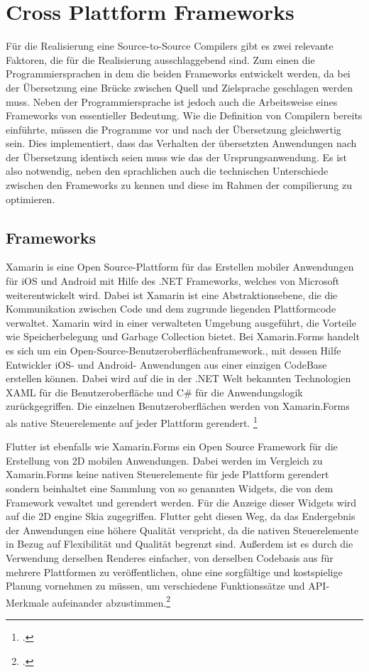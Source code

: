 \chapter{Cross Plattform Frameworks}
Für die Realisierung eine Source-to-Source Compilers gibt es zwei relevante Faktoren,  die für die Realisierung ausschlaggebend sind.  Zum einen die Programmiersprachen in dem die beiden Frameworks entwickelt werden,  da bei der Übersetzung eine Brücke zwischen Quell und Zielsprache geschlagen werden muss.  Neben der Programmiersprache ist jedoch auch die Arbeitsweise eines Frameworks von essentieller Bedeutung.  Wie die Definition von Compilern bereits einführte,  müssen die Programme vor und nach der Übersetzung gleichwertig sein.  Dies implementiert,  dass das Verhalten der übersetzten Anwendungen nach der Übersetzung identisch seien muss wie das der Ursprungsanwendung.  Es ist also notwendig,  neben den sprachlichen auch die technischen Unterschiede zwischen den Frameworks zu kennen und diese im Rahmen der compilierung zu optimieren. 

\section{Frameworks}
Xamarin is eine Open Source-Plattform für das Erstellen mobiler Anwendungen für iOS und Android mit Hilfe des .NET Frameworks, welches von Microsoft weiterentwickelt wird.  Dabei ist Xamarin ist eine Abstraktionsebene, die die Kommunikation zwischen Code und dem zugrunde liegenden Plattformcode verwaltet.  Xamarin wird in einer verwalteten Umgebung ausgeführt, die Vorteile wie Speicherbelegung und Garbage Collection bietet.  Bei Xamarin.Forms handelt es sich um ein Open-Source-Benutzeroberflächenframework., mit dessen Hilfe Entwickler iOS- und Android- Anwendungen aus einer einzigen CodeBase erstellen können.  Dabei wird auf die in der .NET Welt bekannten Technologien XAML  für die Benutzeroberfläche und C\# für die Anwendungslogik zurückgegriffen.  Die einzelnen Benutzeroberflächen werden von Xamarin.Forms als native Steuerelemente auf jeder Plattform gerendert.  \footcite[Vgl.][Abgerufen am \today]{MicrosoftWhatIsXam2020}

Flutter ist ebenfalls wie Xamarin.Forms ein Open Source Framework für die Erstellung von 2D mobilen Anwendungen.  Dabei werden im Vergleich zu Xamarin.Forms keine nativen Steuerelemente für jede Plattform gerendert sondern beinhaltet eine Sammlung von so genannten Widgets, die von dem Framework vewaltet und gerendert werden.  Für die Anzeige dieser Widgets wird auf die 2D engine Skia zugegriffen.  Flutter geht diesen Weg,  da das Endergebnis der Anwendungen eine höhere Qualität verspricht, da die nativen Steuerelemente in Bezug auf Flexibilität und Qualität begrenzt sind.  Außerdem ist es durch die Verwendung derselben Renderes einfacher, von derselben Codebasis aus für mehrere Plattformen zu veröffentlichen,  ohne eine sorgfältige und kostspielige Planung vornehmen zu müssen,  um verschiedene Funktionssätze und API-Merkmale aufeinander abzustimmen.\footcite[Vgl.][Abgerufen am \today]{GoogleFlutterFAQ2020}

